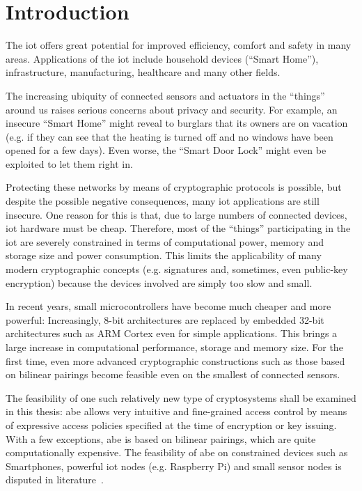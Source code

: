 
\chapter{Introduction}\label{chapter:introduction}

The \acrfull{iot} offers great potential for improved efficiency, comfort and safety in many areas. %
Applications of the \acrshort{iot} include household devices (``Smart Home''), infrastructure, manufacturing, healthcare and many other fields.

The increasing ubiquity of connected sensors and actuators in the ``things'' around us raises serious concerns about privacy and security.
For example, an insecure ``Smart Home'' might reveal to burglars that its owners are on vacation (e.g. if they can see that the heating is turned off and no windows have been opened for a few days).
Even worse, the ``Smart Door Lock'' might even be exploited to let them right in.

Protecting these networks by means of cryptographic protocols is possible, but despite the possible negative consequences, many \acrshort{iot} applications are still insecure.
One reason for this is that, due to large numbers of connected devices, \acrshort{iot} hardware must be cheap.
Therefore, most of the ``things'' participating in the \acrshort{iot} are severely constrained in terms of computational power, memory and storage size and power consumption. 
This limits the applicability of many modern cryptographic concepts (e.g. signatures and, sometimes, even public-key encryption) because the devices involved are simply too slow and small.

In recent years, small microcontrollers have become much cheaper and more powerful: 
Increasingly, 8-bit architectures are replaced by embedded 32-bit architectures such as ARM Cortex even for simple applications. %
This brings a large increase in computational performance, storage and memory size.
For the first time, even more advanced cryptographic constructions such as those based on bilinear pairings become feasible even on the smallest of connected sensors.

The feasibility of one such relatively new type of cryptosystems shall be examined in this thesis: 
\acrfull{abe} allows very intuitive and fine-grained access control by means of expressive access policies specified at the time of encryption or key issuing.
With a few exceptions, \acrshort{abe} is based on bilinear pairings, which are quite computationally expensive.
The feasibility of \acrshort{abe} on constrained devices such as Smartphones, powerful \acrshort{iot} nodes (e.g. Raspberry Pi) and small sensor nodes is disputed in literature~\cite{wang_performance_2014,ambrosin_feasibility_2016,ambrosin_feasibility_2015,girgenti_feasibility_2019,borgh_attribute-based_2016}.

